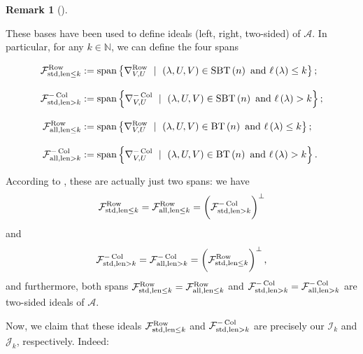 \documentclass[numbers=enddot,12pt,final,onecolumn,notitlepage]{scrartcl}%
\numberwithin{exer}{subsection}
\theoremstyle{definition}
\newtheorem{remk}[theo]{Remark}
\newenvironment{remark}[1][]
{\begin{remk}[#1]\begin{leftbar}}
{\end{leftbar}\end{remk}}
\newcommand{\MurpF}{\vphantom{\int_g^g}\mathcal{F}}
\begin{document}
\begin{remark}
These bases have been used to define ideals (left, right, two-sided) of
$\mathcal{A}$. In particular, for any $k\in\mathbb{N}$, we can define the four
spans%
\begin{align*}
\MurpF_{\operatorname*{std},\operatorname*{len}\leq k}^{\operatorname*{Row}}
&  :=\operatorname*{span}\left\{  \nabla_{V,U}^{\operatorname*{Row}}%
\ \mid\ \left(  \lambda,U,V\right)  \in\operatorname*{SBT}\left(  n\right)
\text{ and }\ell\left(  \lambda\right)  \leq k\right\}  ;\\
\MurpF_{\operatorname*{std},\operatorname*{len}>k}^{-\operatorname*{Col}}  &
:=\operatorname*{span}\left\{  \nabla_{V,U}^{-\operatorname*{Col}}%
\ \mid\ \left(  \lambda,U,V\right)  \in\operatorname*{SBT}\left(  n\right)
\text{ and }\ell\left(  \lambda\right)  >k\right\}  ;\\
\MurpF_{\operatorname*{all},\operatorname*{len}\leq k}^{\operatorname*{Row}}
&  :=\operatorname*{span}\left\{  \nabla_{V,U}^{\operatorname*{Row}}%
\ \mid\ \left(  \lambda,U,V\right)  \in\operatorname*{BT}\left(  n\right)
\text{ and }\ell\left(  \lambda\right)  \leq k\right\}  ;\\
\MurpF_{\operatorname*{all},\operatorname*{len}>k}^{-\operatorname*{Col}}  &
:=\operatorname*{span}\left\{  \nabla_{V,U}^{-\operatorname*{Col}}%
\ \mid\ \left(  \lambda,U,V\right)  \in\operatorname*{BT}\left(  n\right)
\text{ and }\ell\left(  \lambda\right)  >k\right\}  .
\end{align*}
According to \cite[Theorem 6.8.47]{sga}, these are actually just two spans: we
have%
\[
\MurpF_{\operatorname*{std},\operatorname*{len}\leq k}^{\operatorname*{Row}%
}=\MurpF_{\operatorname*{all},\operatorname*{len}\leq k}^{\operatorname*{Row}%
}=\left(  \MurpF_{\operatorname*{std},\operatorname*{len}>k}%
^{-\operatorname*{Col}}\right)  ^{\perp}%
\]
and
\[
\MurpF_{\operatorname*{std},\operatorname*{len}>k}^{-\operatorname*{Col}%
}=\MurpF_{\operatorname*{all},\operatorname*{len}>k}^{-\operatorname*{Col}%
}=\left(  \MurpF_{\operatorname*{std},\operatorname*{len}\leq k}%
^{\operatorname*{Row}}\right)  ^{\perp},
\]
and furthermore, both spans $\MurpF_{\operatorname*{std},\operatorname*{len}%
\leq k}^{\operatorname*{Row}}=\MurpF_{\operatorname*{all},\operatorname*{len}%
\leq k}^{\operatorname*{Row}}$ and $\MurpF_{\operatorname*{std}%
,\operatorname*{len}>k}^{-\operatorname*{Col}}=\MurpF_{\operatorname*{all}%
,\operatorname*{len}>k}^{-\operatorname*{Col}}$ are two-sided ideals of
$\mathcal{A}$.

Now, we claim that these ideals $\MurpF_{\operatorname*{std}%
,\operatorname*{len}\leq k}^{\operatorname*{Row}}$ and
$\MurpF_{\operatorname*{std},\operatorname*{len}>k}^{-\operatorname*{Col}}$
are precisely our $\mathcal{I}_{k}$ and $\mathcal{J}_{k}$, respectively. Indeed:


\end{remark}
\end{document}
